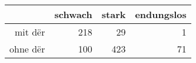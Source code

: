 \begin{tabular}{rrrr}
  \hline
 & schwach & stark & endungslos \\ 
  \hline
mit dër & 218 & 29 & 1 \\ 
  ohne dër & 100 & 423 & 71 \\ 
   \hline
\end{tabular}
